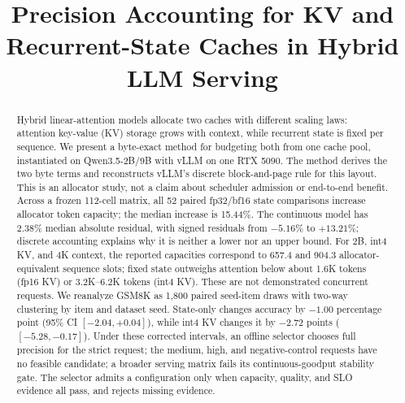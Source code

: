 \documentclass[conference,letterpaper,10pt]{IEEEtran}
\begin{document}
\title{Precision Accounting for KV and Recurrent-State Caches in Hybrid LLM Serving}

\author{%
}

\maketitle

\begin{abstract}
Hybrid linear-attention models allocate two caches with different scaling
laws: attention key-value (KV) storage grows with context, while recurrent
state is fixed per sequence. We present a byte-exact method for budgeting both
from one cache pool, instantiated on Qwen3.5-2B/9B with vLLM on one RTX 5090.
The method derives the two byte terms and reconstructs vLLM's discrete
block-and-page rule for this layout. This is an allocator study, not a claim
about scheduler admission or end-to-end benefit. Across a frozen 112-cell
matrix,
all 52 paired fp32/bf16 state comparisons increase allocator token capacity;
the median increase is 15.44\%. The continuous model has 2.38\% median
absolute residual, with signed residuals from $-5.16\%$ to $+13.21\%$;
discrete accounting explains why it is neither a lower nor an upper bound.
For 2B, int4 KV, and 4K context, the reported capacities correspond to 657.4
and 904.3 allocator-equivalent sequence slots; fixed state outweighs attention
below about 1.6K tokens (fp16 KV) or 3.2K--6.2K tokens (int4 KV). These are
not demonstrated concurrent requests. We reanalyze GSM8K as 1,800 paired
seed-item draws with two-way clustering by item and dataset seed. State-only
changes accuracy by $-1.00$ percentage point (95\% CI $[-2.04,+0.04]$), while
int4 KV changes it by $-2.72$ points ($[-5.28,-0.17]$). Under these corrected
intervals, an offline selector chooses full precision for the strict request;
the medium, high, and negative-control requests have no feasible candidate; a
broader serving matrix fails its continuous-goodput stability gate. The
selector admits a configuration only when capacity, quality, and SLO evidence
all pass, and rejects missing evidence.
\end{abstract}
\end{document}
